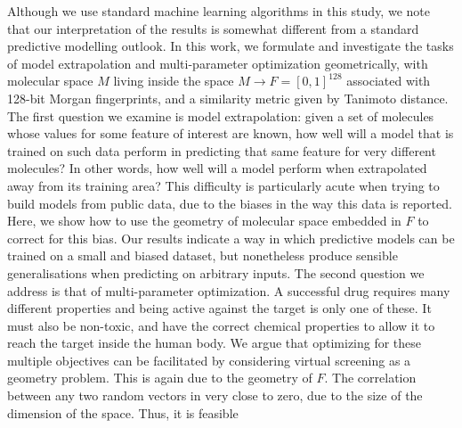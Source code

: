 \documentclass[journal=jacsat,manuscript=article]{achemso}
\begin{document}
\newline
\newline
Although we use standard machine learning algorithms in this study, we note that our interpretation of the results is somewhat different from a standard predictive modelling outlook.
In this work, we formulate and investigate the tasks of model extrapolation and multi-parameter optimization geometrically, with molecular space $M$ living inside the space $M \to F = [0, 1]^{128}$ associated with 128-bit Morgan fingerprints, and a similarity metric given by Tanimoto distance. 
\newline
\newline
The first question we examine is model extrapolation: given a set of molecules whose values for some feature of interest are known, how well will a model that is trained on such data perform in predicting that same feature for very different molecules? In other words, how well will a model perform when extrapolated away from its training area? This difficulty is particularly acute when trying to build models from public data, due to the biases in the way this data is reported\cite{Kalliokoski2013,Tiikkainen2013}. Here, we show how to use the geometry of molecular space embedded in $F$ to correct for this bias. Our results indicate a way in which predictive models can be trained on a small and %
biased dataset, but nonetheless produce sensible generalisations when predicting on arbitrary inputs.
\newline
\newline
The second question we address is that of multi-parameter optimization.  A successful drug requires many different properties and being active against the target is only one of these.  It must also be non-toxic, and have the correct chemical properties to allow it to reach the target inside the human body.  We argue that optimizing for these multiple objectives can be facilitated by considering virtual screening as a geometry problem.
This is again due to the geometry of $F$. The correlation between any two random vectors in very close to zero, due to the size of the dimension of the space.  Thus, it is feasible 
\end{document}
